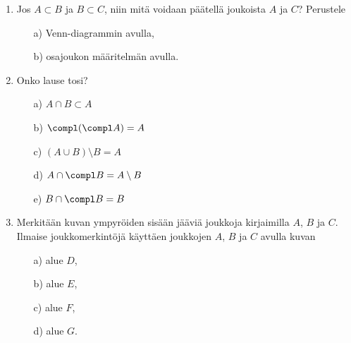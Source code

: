 \begin{enumerate}
\item Jos $A\subset B$ ja $B\subset C$, niin mitä voidaan päätellä joukoista $A$ ja $C$? Perustele 
\begin{itemize}
\item[a)] Venn-diagrammin avulla,
\item[b)] osajoukon määritelmän avulla.
\end{itemize}

\item
Onko lause tosi?
\begin{itemize}
\item[a)] $A \cap B \subset A$
\item[b)] $\compl (\compl A) = A$
\item[c)] $(A\cup B) \setminus B = A$
\item[d)] $A \cap \compl B = A \setminus B$
\item[e)] $B \cap \compl B = B$
\end{itemize}

\item Merkitään kuvan ympyröiden sisään jääviä joukkoja kirjaimilla $A$, $B$ ja $C$. Ilmaise joukkomerkintöjä käyttäen joukkojen $A$, $B$ ja $C$ avulla kuvan
\begin{itemize}
\item[a)] alue $D$,
\item[b)] alue $E$,
\item[c)] alue $F$,
\item[d)] alue $G$.
\end{itemize}

\medskip

\begin{center}



\end{center}

\medskip


\end{enumerate}
